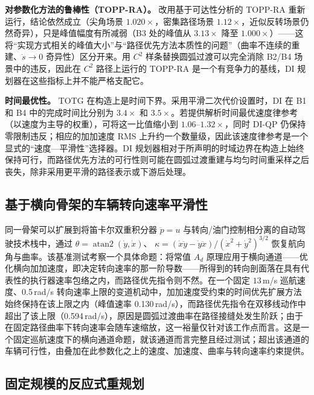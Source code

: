 \textbf{对参数化方法的鲁棒性（TOPP-RA）。} 改用基于可达性分析的 TOPP-RA \cite{toppra} 重新运行，结论依然成立（尖角场景 \(1.020\times\)，密集路径场景 \(1.12\times\)，近似反转场景仍然奇异），只是峰值幅度有所减弱（B3 处的峰值从 \(3.13\times\) 降至 \(1.000\times\)）——这将“实现方式相关的峰值大小”与“路径优先方法本质性的问题”（曲率不连续的重建、\(\dot s\to0\) 奇异性）区分开来。用 \(C^2\) 样条替换圆弧过渡可以完全消除 B2/B4 场景中的违反，因此在 \(C^2\) 路径上运行的 TOPP-RA 是一个有竞争力的基线，DI 规划器在这些指标上并不能严格支配它。

\textbf{时间最优性。} TOTG 在构造上是时间下界。采用平滑二次代价设置时，DI 在 B1 和 B4 中的完成时间比分别为 \(3.4\times\) 和 \(3.5\times\)。若提供解析时间最优速度律参考（以速度为主导的权重），可将这一比值缩小到 \(1.06\)--\(1.32\times\)，同时 DI-QP 仍保持零限制违反；相应的加加速度 RMS 上升约一个数量级，因此该速度律参考是一个显式的“速度—平滑性”选择器。DI 规划器相对于所声明的时域边界在构造上始终保持可行，而路径优先方法的可行性则可能在圆弧过渡重建与均匀时间重采样之后丧失，除非采用更平滑的路径表示或下游后处理。

\subsection{基于横向骨架的车辆转向速率平滑性}\label{c.-autonomous-vehicle-motion-planning-with-the-double-integrator-backbone}

同一骨架可以扩展到将笛卡尔双重积分器 \(\ddot p=u\) 与转向/油门控制相分离的自动驾驶技术栈中，通过
\(\theta=\operatorname{atan2}(\dot y,\dot x)\)、
\(\kappa=(\dot x\ddot y-\dot y\ddot x)/(\dot x^2+\dot y^2)^{3/2}\) 恢复航向角与曲率。该基准测试考察一个具体命题：将常值 \(A_d\) 原理应用于横向通道——优化横向加加速度，即决定转向速率的那一阶导数——所得到的转向剖面落在具有代表性的执行器速率包络之内，而路径优先指令则不然。在一个固定 \(13\)\,m/s 巡航速度、0.5\,rad/s 转向速率上限的变道机动中，加加速度受约束的时间优先扩展方法始终保持在该上限之内（峰值速率 0.130\,rad/s），而路径优先指令在双移线动作中超出了该上限（0.594\,rad/s），原因是圆弧过渡曲率在路径接缝处发生阶跃；由于在固定路径曲率下转向速率会随车速缩放，这一裕量仅针对该工作点而言。这是一个固定巡航速度下的横向通道命题，就该通道而言完整且经过测试；超出该通道的车辆可行性，由叠加在此参数化之上的速度、加速度、曲率与转向速率约束提供。

\subsection{固定规模的反应式重规划}\label{d.-bounded-latency-reactive-replanning}

